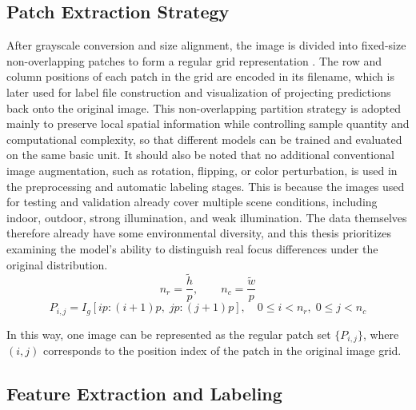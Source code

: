 \subsection{Patch Extraction Strategy}
\par After grayscale conversion and size alignment, the image is divided into
fixed-size non-overlapping patches to form a regular grid representation
\cite{Hou_2016_CVPR}. The row and column positions of each patch in the grid
are encoded in its filename, which is later used for label file construction
and visualization of projecting predictions back onto the original image. This
non-overlapping partition strategy is adopted mainly to preserve local spatial
information while controlling sample quantity and computational complexity, so
that different models can be trained and evaluated on the same basic unit. It
should also be noted that no additional conventional image augmentation, such
as rotation, flipping, or color perturbation, is used in the preprocessing and
automatic labeling stages. This is because the images used for testing and
validation already cover multiple scene conditions, including indoor, outdoor,
strong illumination, and weak illumination. The data themselves therefore
already have some environmental diversity, and this thesis prioritizes
examining the model's ability to distinguish real focus differences under the
original distribution.
\begin{equation}
    n_r=\frac{\tilde{h}}{p},\qquad n_c=\frac{\tilde{w}}{p}
    \label{eq:grid-size}
\end{equation}
\begin{equation}
    P_{i,j}=I_g[ip:(i+1)p,\; jp:(j+1)p],\quad
    0\le i<n_r,\; 0\le j<n_c
    \label{eq:patch-split}
\end{equation}
\par In this way, one image can be represented as the regular patch set
$\{P_{i,j}\}$, where $(i,j)$ corresponds to the position index of the patch in
the original image grid.

\subsection{Feature Extraction and Labeling}

